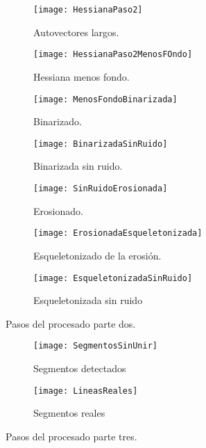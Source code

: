 \begin{figure}
	\begin{subfigure}[c]{.49\linewidth}
	\centering\large \texttt{[image: HessianaPaso2]}
	\caption{Autovectores largos.}\label{fig:2.1.5}
	\end{subfigure}%
	\begin{subfigure}[c]{.49\linewidth}
	\centering\large \texttt{[image: HessianaPaso2MenosFOndo]}
	\caption{Hessiana menos fondo.}\label{fig:2.1.6}
	\end{subfigure}%
	
	\begin{subfigure}[c]{.49\linewidth}
	\centering\large \texttt{[image: MenosFondoBinarizada]}
	\caption{Binarizado.}\label{fig:2.1.7}
	\end{subfigure}%
	\begin{subfigure}[c]{.49\linewidth}
	\centering\large \texttt{[image: BinarizadaSinRuido]}
	\caption{Binarizada sin ruido.}\label{fig:2.1.8}
	\end{subfigure}%
	
	\begin{subfigure}[c]{.49\linewidth}
	\centering\large \texttt{[image: SinRuidoErosionada]}
	\caption{Erosionado.}\label{fig:2.1.9}
	\end{subfigure}%
	\begin{subfigure}[c]{.49\linewidth}
	\centering\large \texttt{[image: ErosionadaEsqueletonizada]}
	\caption{Esqueletonizado de la erosión.}\label{fig:2.1.10}
	\end{subfigure}%
		
	\begin{subfigure}{.49\linewidth}
	\centering\large \texttt{[image: EsqueletonizadaSinRuido]}
	\caption{Esqueletonizada sin ruido}\label{fig:2.1.11}
	\end{subfigure}%
	\caption{Pasos del procesado parte dos.}\label{fig:2.2}

\end{figure}

\begin{figure}

	\begin{subfigure}{.99\linewidth}
	\centering\large \texttt{[image: SegmentosSinUnir]}
	\caption{Segmentos detectados}\label{fig:2.1.12}
	\end{subfigure}%
	
	\begin{subfigure}{.99\linewidth}
	\centering\large \texttt{[image: LineasReales]}
	\caption{Segmentos reales}\label{fig:2.1.13}
	\end{subfigure}%
	
\caption{Pasos del procesado parte tres.}\label{fig:2.3}
\end{figure}

